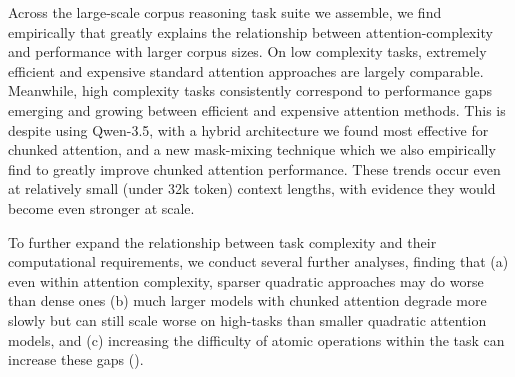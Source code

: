 


Across the large-scale corpus reasoning task suite we assemble, we find empirically that \cname greatly explains the relationship between attention-complexity and performance with larger corpus sizes. On low complexity tasks, extremely efficient and expensive standard attention approaches are largely comparable. Meanwhile, high complexity tasks consistently correspond to performance gaps emerging and growing between efficient and expensive attention methods. This is despite using Qwen-3.5, with a hybrid architecture we found most effective for chunked attention, and a new mask-mixing technique which we also empirically find to greatly improve chunked attention performance. These trends occur even at relatively small (under 32k token) context lengths, with evidence they would become even stronger at scale.

To further expand the relationship between task complexity and their computational requirements, we conduct several further analyses, finding that (a) even within attention complexity, sparser quadratic approaches may do worse than dense ones (b) much larger models with chunked attention degrade more slowly but can still scale worse on high-\cname tasks than smaller quadratic attention models, and (c) increasing the difficulty of atomic operations within the task can increase these gaps (). 

